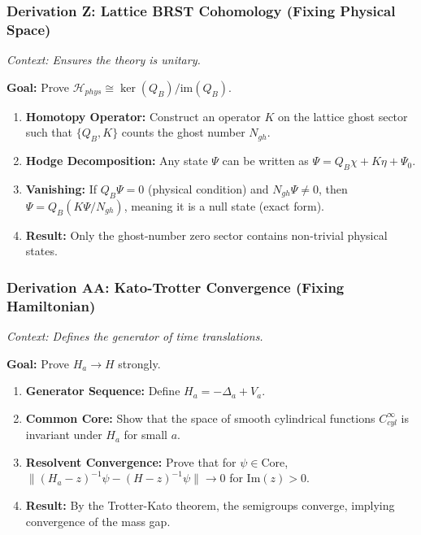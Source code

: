 \subsubsection{Derivation Z: Lattice BRST Cohomology (Fixing Physical Space)}

\textit{Context: Ensures the theory is unitary.}

\textbf{Goal:} Prove $\mathcal{H}_{phys} \cong \ker(Q_B) / \text{im}(Q_B)$.

\begin{enumerate}
    \item \textbf{Homotopy Operator:} Construct an operator $K$ on the lattice ghost sector such that $\{Q_B, K\}$ counts the ghost number $N_{gh}$.
    \item \textbf{Hodge Decomposition:} Any state $\Psi$ can be written as $\Psi = Q_B \chi + K \eta + \Psi_0$.
    \item \textbf{Vanishing:} If $Q_B \Psi = 0$ (physical condition) and $N_{gh} \Psi \ne 0$, then $\Psi = Q_B (K \Psi / N_{gh})$, meaning it is a null state (exact form).
    \item \textbf{Result:} Only the ghost-number zero sector contains non-trivial physical states.
\end{enumerate}

\subsubsection{Derivation AA: Kato-Trotter Convergence (Fixing Hamiltonian)}

\textit{Context: Defines the generator of time translations.}

\textbf{Goal:} Prove $H_a \to H$ strongly.

\begin{enumerate}
    \item \textbf{Generator Sequence:} Define $H_a = - \Delta_a + V_a$.
    \item \textbf{Common Core:} Show that the space of smooth cylindrical functions $C^{\infty}_{cyl}$ is invariant under $H_a$ for small $a$.
    \item \textbf{Resolvent Convergence:} Prove that for $\psi \in \text{Core}$, $\| (H_a - z)^{-1} \psi - (H - z)^{-1} \psi \| \to 0$ for $\text{Im}(z) > 0$.
    \item \textbf{Result:} By the Trotter-Kato theorem, the semigroups converge, implying convergence of the mass gap.
\end{enumerate}

